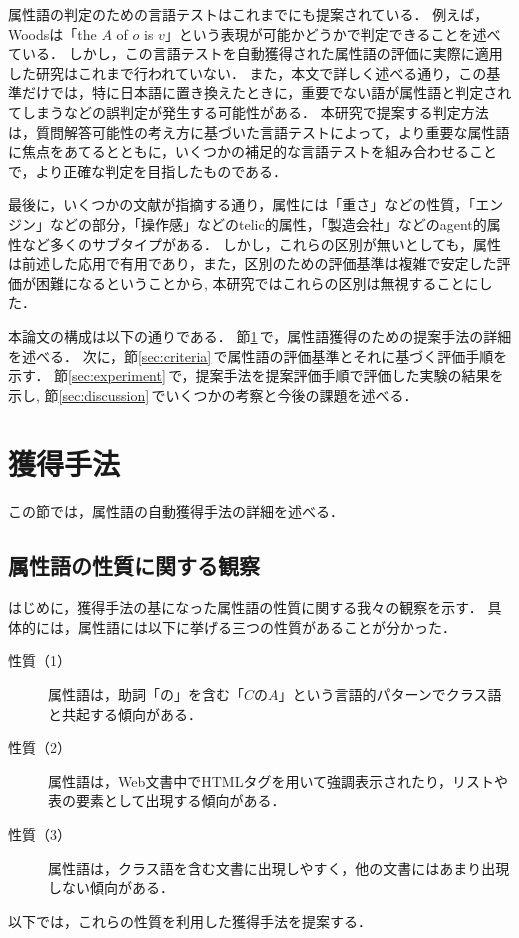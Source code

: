 属性語の判定のための言語テストはこれまでにも提案されている． 例えば，Woodsは「the $A$ of $o$ is $v$」という表現が可能かどうかで判定できることを述べている\cite{Woods_1975}．
しかし，この言語テストを自動獲得された属性語の評価に実際に適用した研究はこれまで行われていない． また，本文で詳しく述べる通り，この基準だけでは，特に日本語に置き換えたときに，重要でない語が属性語と判定されてしまうなどの誤判定が発生する可能性がある．
本研究で提案する判定方法は，質問解答可能性の考え方に基づいた言語テストによって，より重要な属性語に焦点をあてるとともに，いくつかの補足的な言語テストを組み合わせることで，より正確な判定を目指したものである．

最後に，いくつかの文献が指摘する通り，属性には「重さ」などの性質，「エンジン」などの部分，「操作感」などのtelic的属性，「製造会社」などのagent的属性など多くのサブタイプがある\cite{Guarino1992,GenerativeLexicon}．
しかし，これらの区別が無いとしても，属性は前述した応用で有用であり，また，区別のための評価基準は複雑で安定した評価が困難になるということから,
本研究ではこれらの区別は無視することにした．

本論文の構成は以下の通りである．
節\ref{sec:method}\,で，属性語獲得のための提案手法の詳細を述べる．
次に，節\ref{sec:criteria}\,で属性語の評価基準とそれに基づく評価手順を示す．
節\ref{sec:experiment}\,で，提案手法を提案評価手順で評価した実験の結果を示し,
節\ref{sec:discussion}\,でいくつかの考察と今後の課題を述べる．


\section{獲得手法}
\label{sec:method}
この節では，属性語の自動獲得手法の詳細を述べる．

\subsection{属性語の性質に関する観察}
\label{sec:obs}
はじめに，獲得手法の基になった属性語の性質に関する我々の観察を示す．
具体的には，属性語には以下に挙げる三つの性質があることが分かった．
\begin{description}
\item[性質（1）] 属性語は，助詞「の」を含む「$C$の$A$」という言語的パターンでクラス語と共起する傾向がある．
\item[性質（2）] 属性語は，Web文書中でHTMLタグを用いて強調表示されたり，リストや表の要素として出現する傾向がある． 
\item[性質（3）] 属性語は，クラス語を含む文書に出現しやすく，他の文書にはあまり出現しない傾向がある．
\end{description}
以下では，これらの性質を利用した獲得手法を提案する．

